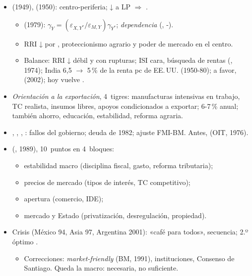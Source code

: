 \documentclass{article}
\begin{document}
\begin{columnas}
\begin{itemize}
\item {} (1949),  (1950): centro-periferia;  ↓ a LP $\Rightarrow$  .
  \begin{itemize}
  \item {} (1979): $\gamma_Y=(\varepsilon_{X,Y^*}/\varepsilon_{M,Y})\gamma_{Y^*}$; \emph{dependencia} (, -).
  \item RRI ↓ por , proteccionismo agrario y poder de mercado en el centro.
  \item Balance: RRI ↓ débil y con rupturas; ISI cara, búsqueda de rentas (, 1974); India 6,5 $\to$ 5\,\% de la renta pc de EE.\,UU. (1950-80); a favor,  (2002); hoy vuelve .
  \end{itemize}
\item \emph{Orientación a la exportación}, 4~tigres: manufacturas intensivas en trabajo, TC realista, insumos libres, apoyos condicionados a exportar; 6-7\,\% anual; también ahorro, educación, estabilidad, reforma agraria.
\end{itemize}
\begin{itemize}
\item {}, , , : fallos del gobierno; deuda de 1982; ajuste FMI-BM. Antes,  (OIT, 1976).
\item {} (, 1989), 10~puntos en 4~bloques:
  \begin{itemize}
  \item estabilidad macro (disciplina fiscal, gasto, reforma tributaria);
  \item precios de mercado (tipos de interés, TC competitivo);
  \item apertura (comercio, IDE);
  \item mercado y Estado (privatización, desregulación, propiedad).
  \end{itemize}
\item Crisis (México 94, Asia 97, Argentina 2001): «café para todos», secuencia; 2.º óptimo .
  \begin{itemize}
  \item Correcciones: \emph{market-friendly} (BM, 1991), instituciones, Consenso de Santiago. Queda la macro: necesaria, no suficiente.
  \end{itemize}
\end{itemize}


\end{columnas}
\end{document}
